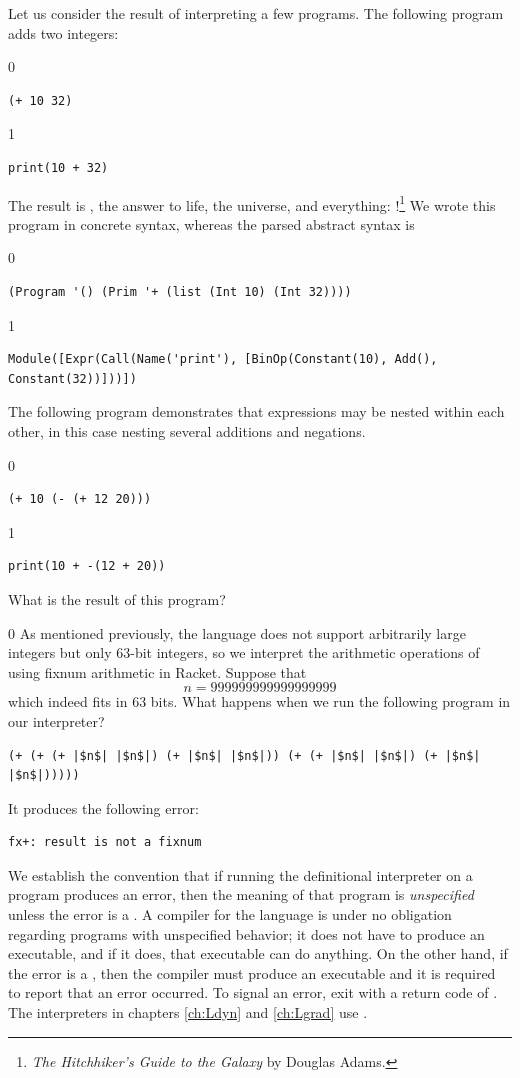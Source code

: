 \documentclass[7x10]{TimesAPriori_MIT}%
\def\racketEd{0}
\def\pythonEd{1}
\def\edition{0}
\numberwithin{theorem}{chapter}
\numberwithin{definition}{chapter}
\numberwithin{equation}{chapter}
\begin{document}
Let us consider the result of interpreting a few \LangInt{} programs. The
following program adds two integers:
{\if\edition\racketEd
\begin{lstlisting}
(+ 10 32)
\end{lstlisting}
\fi}
{\if\edition\pythonEd
\begin{lstlisting}
print(10 + 32)
\end{lstlisting}
\fi}
%
\noindent The result is , the answer to life, the universe,
and everything: !\footnote{\emph{The Hitchhiker's Guide to
    the Galaxy} by Douglas Adams.}
%
We wrote this program in concrete syntax, whereas the parsed
abstract syntax is
{\if\edition\racketEd
\begin{lstlisting}
(Program '() (Prim '+ (list (Int 10) (Int 32))))
\end{lstlisting}
\fi}
{\if\edition\pythonEd
\begin{lstlisting}
Module([Expr(Call(Name('print'), [BinOp(Constant(10), Add(), Constant(32))]))])    
\end{lstlisting}
\fi}
The following program demonstrates that expressions may be nested within
each other, in this case nesting several additions and negations.
{\if\edition\racketEd
\begin{lstlisting}
(+ 10 (- (+ 12 20)))
\end{lstlisting}
\fi}
{\if\edition\pythonEd
\begin{lstlisting}
print(10 + -(12 + 20))
\end{lstlisting}
\fi}
%
\noindent What is the result of this program?

{\if\edition\racketEd
As mentioned previously, the \LangInt{} language does not support
arbitrarily large integers but only $63$-bit integers, so we
interpret the arithmetic operations of \LangInt{} using fixnum arithmetic
in Racket.
Suppose that
\[
  n = 999999999999999999
\]
which indeed fits in $63$ bits.  What happens when we run the
following program in our interpreter?
\begin{lstlisting}
(+ (+ (+ |$n$| |$n$|) (+ |$n$| |$n$|)) (+ (+ |$n$| |$n$|) (+ |$n$| |$n$|)))))
\end{lstlisting}
It produces the following error:
\begin{lstlisting}
fx+: result is not a fixnum
\end{lstlisting}
We establish the convention that if running the definitional
interpreter on a program produces an error, then the meaning of that
program is \emph{unspecified} unless the
error is a . A compiler for the language is under
no obligation regarding programs with unspecified behavior; it does
not have to produce an executable, and if it does, that executable can
do anything.  On the other hand, if the error is a
, then the compiler must produce an executable and
it is required to report that an error occurred. To signal an error,
exit with a return code of .  The interpreters in chapters
\ref{ch:Ldyn} and \ref{ch:Lgrad} use
.
\fi}
\end{document}

